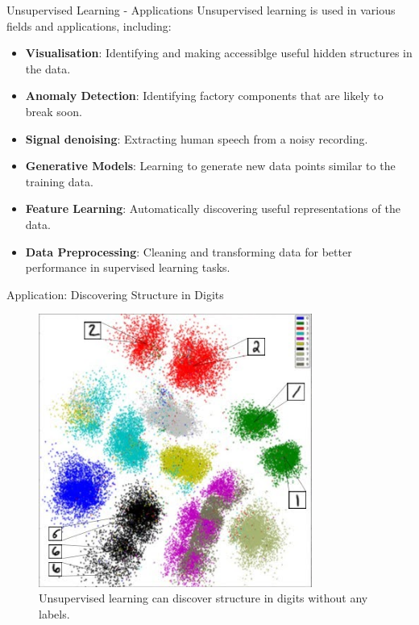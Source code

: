 \begin{frame}[allowframebreaks]{Unsupervised Learning - Applications}
    Unsupervised learning is used in various fields and applications, including:
    \begin{itemize}
        \item \textbf{Visualisation}: Identifying and making accessiblge useful hidden structures in the data.
        \item \textbf{Anomaly Detection}: Identifying factory components that are likely to break soon.
        \item \textbf{Signal denoising}: Extracting human speech from a noisy recording.
        \item \textbf{Generative Models}: Learning to generate new data points similar to the training data.
        \item \textbf{Feature Learning}: Automatically discovering useful representations of the data.
        \item \textbf{Data Preprocessing}: Cleaning and transforming data for better performance in supervised learning tasks.
    \end{itemize}
\end{frame}

\begin{frame}{Application: Discovering Structure in Digits}
    \begin{figure}
    \centering
    \includegraphics[width=0.8\textwidth,height=0.75\textheight,keepaspectratio]{images/dul-app-discover-structure.jpg}
    \caption{Unsupervised learning can discover structure in digits without any labels.}
    \end{figure}
\end{frame}

